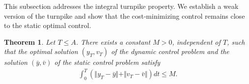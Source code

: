 \documentclass[10pt, a4]{amsart}
\newcounter{assu}
\theoremstyle{plain}
\newtheorem{theorem}[lemma]{Theorem}
\theoremstyle{definition}
\theoremstyle{remark}
\newtheorem{remark}[lemma]{Remark}
\numberwithin{equation}{section}
\begin{document}

This subsection addresses the integral turnpike property. We establish a weak version of the turnpike and show that the cost‑minimizing control remains close to the static optimal control.

\begin{theorem}\label{t6.4}
Let \(T \le A\). There exists a constant \(M>0\), independent of \(T\), such that the optimal solution \((y_T,v_T)\) of the dynamic control problem and the solution \((\bar y,\bar v)\) of the static control problem satisfy
\begin{align}
          \displaystyle\int_0^T\left(\Vert y_T-\bar{y}\Vert+\Vert v_T-\bar{v}\Vert\right)dt\leq  M.
      \end{align}
\end{theorem}
\end{document}
